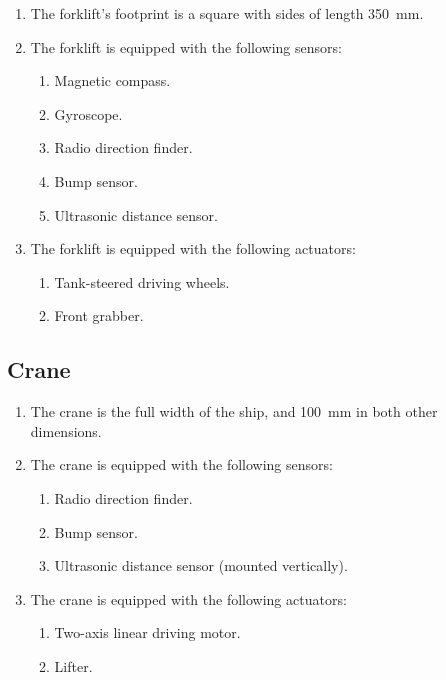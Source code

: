 \begin{enumerate}
  \item The forklift's footprint is a square with sides of length \SI{350}{mm}.
  \item The forklift is equipped with the following sensors:
  \begin{enumerate}
    \item Magnetic compass.
    \item Gyroscope.
    \item Radio direction finder.
    \item Bump sensor.
    \item Ultrasonic distance sensor.
  \end{enumerate}
  \item The forklift is equipped with the following actuators:
  \begin{enumerate}
    \item Tank-steered driving wheels.
    \item Front grabber.
  \end{enumerate}
\end{enumerate}

\subsection{Crane}
\label{spec:crane}

\begin{enumerate}
  \item The crane is the full width of the ship, and \SI{100}{mm}
        in both other dimensions.
  \item The crane is equipped with the following sensors:
  \begin{enumerate}
    \item Radio direction finder.
    \item Bump sensor.
    \item Ultrasonic distance sensor (mounted vertically).
  \end{enumerate}
  \item The crane is equipped with the following actuators:
  \begin{enumerate}
    \item Two-axis linear driving motor.
    \item Lifter.
  \end{enumerate}
\end{enumerate}
